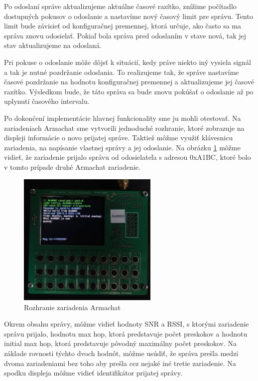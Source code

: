 \documentclass[slovak,master]{diploma}
\begin{document}
Po odoslaní správe aktualizujeme aktuálne časové razítko, znížime počítadlo dostupných pokusov o odoslanie a nastavíme nový časový limit pre správu. Tento 
limit bude závisieť od konfiguračnej premennej, ktorá určuje, ako často sa ma správa znovu odosielať. Pokiaľ bola správa pred odoslaním v stave nová, tak jej stav aktualizujeme 
na odoslaná.

Pri pokuse o odoslanie môže dôjsť k situácií, kedy práve niekto iný vysiela signál a tak je nutné pozdržanie odoslania. To realizujeme tak, že správe nastavíme 
časové pozdržanie na hodnotu konfiguračnej premennej a aktualizujeme jej časové razítko. Výsledkom bude, že táto správa sa bude znovu pokúšať o odoslanie až po uplynutí 
časového intervalu.

Po dokončení implementácie hlavnej funkcionality sme ju mohli otestovať. Na zariadeniach Armachat sme vytvorili jednoduché rozhranie, 
ktoré zobrazuje na displeji informácie o novo prijatej správe. Taktiež môžme využiť klávesnicu zariadenia, na napísanie vlastnej správy a jej odoslanie.
Na obrázku \ref{fig:armRec} môžme vidieť, že zariadenie prijalo správu od odosielateľa s adresou 0xA1BC, ktoré bolo v tomto prípade druhé Armachat zariadenie.
\newpage
\begin{figure}
	\centering
	\includegraphics[width=0.6\textwidth]{Figures/armRec.jpg}
	\caption{Rozhranie zariadenia Armachat}
	\label{fig:armRec}
\end{figure}

Okrem obsahu správy, môžme vidieť hodnoty SNR a RSSI, s ktorými zariadenie správu prijalo, hodnotu max hop, ktorá predstavuje počet preskokov a hodnotu initial max hop, 
ktorá predstavuje pôvodný maximálny počet preskokov. Na základe rovnosti týchto dvoch hodnôt, môžme usúdiť, že správa prešla medzi dvoma zariadeniami bez toho aby prešla 
cez nejaké iné tretie zariadenie. Na spodku displeja môžme vidieť identifikátor prijatej správy.
\end{document}

